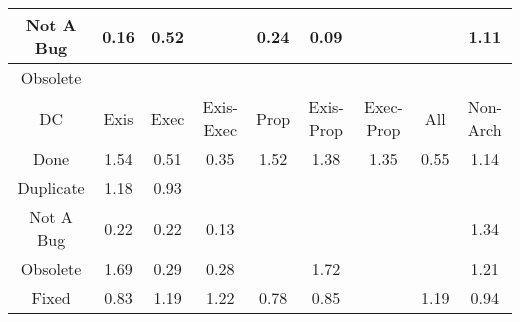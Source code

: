 \begin{tabular}{|c||c|c|c|c|c|c|c|c|}
\hline
Not A Bug & \cellcolor[rgb]{0.7718687214673926,0.18617861494565835,0.29107747336956646} 0.16 & \cellcolor[rgb]{0.8305998760370095,0.46417274657517765,0.34589321763454206} 0.52 &  & \cellcolor[rgb]{0.7844700590641843,0.2458249462371394,0.3028387217932388} 0.24 & \cellcolor[rgb]{0.76,0.13,0.28} 0.09 &  &  & \cellcolor[rgb]{0.9063641399649479,0.838277750509712,0.42} 1.11 \\ 
\hline
Obsolete &  &  &  &  &  &  &  &  \\ 
\hline
\hline
DC & Exis & Exec & Exis-Exec & Prop & Exis-Prop & Exec-Prop & All & Non-Arch \\ 
\hline
Done & \cellcolor[rgb]{0.8918489409206739,0.8314021299097929,0.42} 1.54 & \cellcolor[rgb]{0.8300361705567165,0.4615045406351248,0.34536709251960207} 0.51 & \cellcolor[rgb]{0.80316395990198,0.33430941020270516,0.32028636257518134} 0.35 & \cellcolor[rgb]{0.892614904409869,0.8317649547204642,0.42} 1.52 & \cellcolor[rgb]{0.8973710717899435,0.8340178761110258,0.42} 1.38 & \cellcolor[rgb]{0.8981149309060331,0.8343702304291736,0.42} 1.35 & \cellcolor[rgb]{0.8351992532478054,0.48594313203961254,0.3501859696979518} 0.55 & \cellcolor[rgb]{0.9051597100930501,0.8377072310967079,0.42} 1.14 \\ 
\hline
Duplicate & \cellcolor[rgb]{0.9038985437876921,0.8371098365310119,0.42} 1.18 & \cellcolor[rgb]{0.8991066354510175,0.7884380744681497,0.409832859754283} 0.93 &  &  &  &  &  &  \\ 
\hline
Not A Bug & \cellcolor[rgb]{0.7816322977647179,0.23239287608633144,0.3001901445804034} 0.22 & \cellcolor[rgb]{0.7821973960071578,0.23506767443388,0.30071756960668056} 0.22 & \cellcolor[rgb]{0.7670441550747807,0.16334233402062873,0.28657454473646204} 0.13 &  &  &  &  & \cellcolor[rgb]{0.8987180466587322,0.8346559168383468,0.42} 1.34 \\ 
\hline
Obsolete & \cellcolor[rgb]{0.8867475853717321,0.8289856983339783,0.42} 1.69 & \cellcolor[rgb]{0.7926165400013422,0.28438495600635283,0.3104421040012527} 0.29 & \cellcolor[rgb]{0.7911351704773515,0.2773731402594638,0.3090594924455281} 0.28 &  & \cellcolor[rgb]{0.8859435628746163,0.8286048455721866,0.42} 1.72 &  &  & \cellcolor[rgb]{0.9027977322091875,0.8365883994675098,0.42} 1.21 \\ 
\hline
Fixed & \cellcolor[rgb]{0.8819605754887948,0.7072800573136286,0.39382987045620843} 0.83 & \cellcolor[rgb]{0.9036657633786823,0.8369995721267443,0.42} 1.19 & \cellcolor[rgb]{0.9026354381770846,0.8365115233470399,0.41999999999999993} 1.22 & \cellcolor[rgb]{0.8735511471952101,0.667475430057328,0.38598107071552945} 0.78 & \cellcolor[rgb]{0.8855147804608501,0.7241032941813572,0.3971471284301268} 0.85 &  & \cellcolor[rgb]{0.9035650085907525,0.836951846174567,0.42} 1.19 & \cellcolor[rgb]{0.9005084344191834,0.7950732562508008,0.4111412054579044} 0.94 \\ 

\end{tabular}
